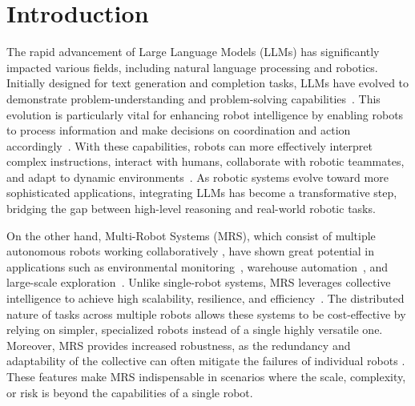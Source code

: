 \section{Introduction}\label{sec:1-intro}
The rapid advancement of Large Language Models (LLMs) has significantly impacted various fields, including natural language processing and robotics. Initially designed for text generation and completion tasks, LLMs have evolved to demonstrate problem-understanding and problem-solving capabilities~\cite{zhao2023survey, wei2022emergent}. This evolution is particularly vital for enhancing robot intelligence by enabling robots to process information and make decisions on coordination and action accordingly~\cite{kim_survey_2024, jeong2024survey}. With these capabilities, robots can more effectively interpret complex instructions, interact with humans, collaborate with robotic teammates, and adapt to dynamic environments~\cite{wang2024large}. As robotic systems evolve toward more sophisticated applications, integrating LLMs has become a transformative step, bridging the gap between high-level reasoning and real-world robotic tasks.

On the other hand, Multi-Robot Systems (MRS), which consist of multiple autonomous robots working collaboratively \cite{queralta2020collaborative, baxter2007multi}, have shown great potential in applications such as environmental monitoring~\cite{ma2018multi, espina2011multi, tiwari2019multi}, warehouse automation~\cite{li2020mechanism, tsang2018novel, rosenfeld2016human}, and large-scale exploration~\cite{burgard2005coordinated, gao2022meeting}. Unlike single-robot systems, MRS leverages collective intelligence to achieve high scalability, resilience, and efficiency~\cite{queralta2020collaborative}. The distributed nature of tasks across multiple robots allows these systems to be cost-effective by relying on simpler, specialized robots instead of a single highly versatile one. Moreover, MRS provides increased robustness, as the redundancy and adaptability of the collective can often mitigate the failures of individual robots \cite{zhou2018resilient, liu2021distributed}. These features make MRS indispensable in scenarios where the scale, complexity, or risk is beyond the capabilities of a single robot.

